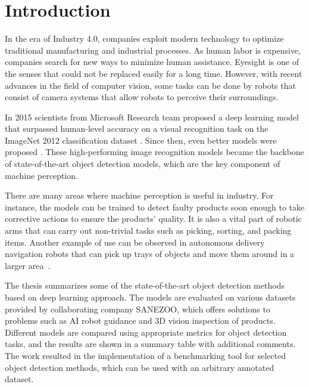 \chapter{Introduction}

In the era of Industry 4.0, companies exploit modern technology to optimize traditional manufacturing and industrial processes. As human labor is expensive, companies search for new ways to minimize human assistance. Eyesight is one of the senses that could not be replaced easily for a long time. However, with recent advances in the field of computer vision, some tasks can be done by robots that consist of camera systems that allow robots to perceive their surroundings. 

In 2015 scientists from Microsoft Research team proposed a deep learning model that surpassed human-level accuracy on a visual recognition task on the ImageNet 2012 classification dataset \cite{surp2015}. Since then, even better models were proposed \cite{resnet, efficientnet}. These high-performing image recognition models became the backbone of state-of-the-art object detection models, which are the key component of machine perception.

There are many areas where machine perception is useful in industry. For instance, the models can be trained to detect faulty products soon enough to take corrective actions to ensure the products' quality. It is also a vital part of robotic arms that can carry out non-trivial tasks such as picking, sorting, and packing items. Another example of use can be observed in autonomous delivery navigation robots that can pick up trays of objects and move them around in a larger area~\cite{bmw}. 

The thesis summarizes some of the state-of-the-art object detection methods based on deep learning approach. The models are evaluated on various datasets provided by collaborating company SANEZOO, which offers solutions to problems such as AI robot guidance and 3D vision inspection of products. Different models are compared using appropriate metrics for object detection tasks, and the results are shown in a summary table with additional comments. The work resulted in the implementation of a benchmarking tool for selected object detection methods, which can be used with an arbitrary annotated dataset.